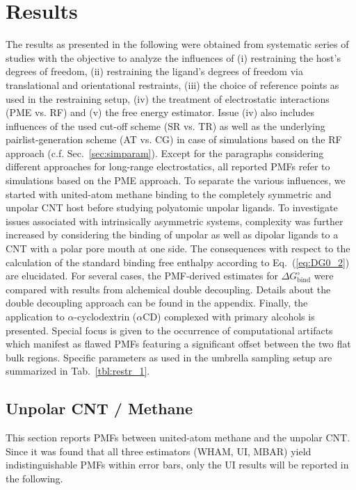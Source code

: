 \documentclass[9pt,lessons,pubversion]{livecoms}
\begin{document}
\section{Results}

The results as presented in the following were obtained from systematic series of studies with the objective to analyze the influences of
(i) restraining the host's degrees of freedom, 
(ii) restraining the ligand's degrees of freedom via translational and orientational restraints,
(iii) the choice of reference points as used in the restraining setup,
(iv) the treatment of electrostatic interactions (PME vs. RF) and
(v) the free energy estimator.
Issue (iv) also includes influences of the used cut-off scheme (SR vs. TR) as well as the underlying pairlist-generation scheme (AT vs. CG) in case of simulations based on the RF approach (c.f. Sec.~\ref{sec:simparam}).
Except for the paragraphs considering different approaches for long-range electrostatics, all reported PMFs refer to simulations based on the PME approach.
To separate the various influences, we started with united-atom methane binding to the completely symmetric and unpolar CNT host before studying polyatomic unpolar ligands.
To investigate issues associated with intrinsically asymmetric systems, complexity was further increased by considering the binding of unpolar as well as dipolar ligands to a CNT with a polar pore mouth at one side.
The consequences with respect to the calculation of the standard binding free enthalpy according to Eq.~(\ref{eq:DG0_2}) are elucidated.
For several cases, the PMF-derived estimates for $\Delta G^\circ_\mathrm{bind}$ were compared with results from alchemical double decoupling.
Details about the double decoupling approach can be found in the appendix.
Finally, the application to $\alpha$-cyclodextrin ($\alpha$CD) complexed with primary alcohols is presented.
Special focus is given to the occurrence of computational artifacts which manifest as flawed PMFs featuring a significant offset between the two flat bulk regions.
Specific parameters as used in the umbrella sampling setup are summarized in Tab.~\ref{tbl:restr_1}.


\subsection{Unpolar CNT / Methane}
\label{res:UnpMet_UnpCNT}

This section reports PMFs between united-atom methane and the unpolar CNT.
Since it was found that all three estimators (WHAM, UI, MBAR) yield indistinguishable PMFs within error bars, only the UI results will be reported in the following.
\end{document}
